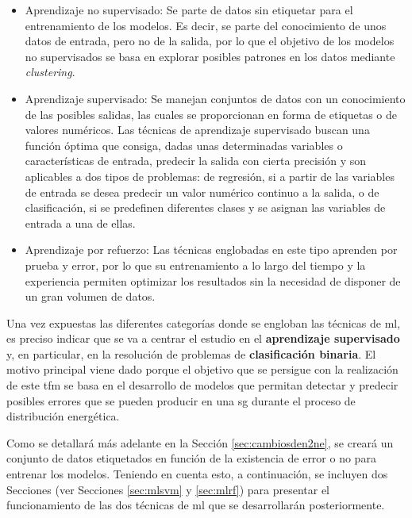 \begin{itemize}
    \item Aprendizaje no supervisado: Se parte de datos sin etiquetar para el entrenamiento de los modelos. Es decir, se parte del conocimiento de unos datos de entrada, pero no de la salida, por lo que el objetivo de los modelos no supervisados se basa en explorar posibles patrones en los datos mediante \textit{clustering}.
    \item Aprendizaje supervisado: Se manejan conjuntos de datos con un conocimiento de las posibles salidas, las cuales se proporcionan en forma de etiquetas o de valores numéricos. Las técnicas de aprendizaje supervisado buscan una función óptima que consiga, dadas unas determinadas variables o características de entrada, predecir la salida con cierta precisión y son aplicables a dos tipos de problemas: de regresión, si a partir de las variables de entrada se desea predecir un valor numérico continuo a la salida, o de clasificación, si se predefinen diferentes clases y se asignan las variables de entrada a una de ellas. 
    \item Aprendizaje por refuerzo: Las técnicas englobadas en este tipo aprenden por prueba y error, por lo que su entrenamiento a lo largo del tiempo y la experiencia permiten optimizar los resultados sin la necesidad de disponer de un gran volumen de datos.
\end{itemize}

Una vez expuestas las diferentes categorías donde se engloban las técnicas de \gls{ml}, es preciso indicar que se va a centrar el estudio en el \textbf{aprendizaje supervisado} y, en particular, en la resolución de problemas de \textbf{clasificación binaria}. El motivo principal viene dado porque el objetivo que se persigue con la realización de este \gls{tfm} se basa en el desarrollo de modelos que permitan detectar y predecir posibles errores que se pueden producir en una \gls{sg} durante el proceso de distribución energética. 

\vspace{3mm}

Como se detallará más adelante en la Sección \ref{sec:cambiosden2ne}, se creará un conjunto de datos etiquetados en función de la existencia de error o no para entrenar los modelos. Teniendo en cuenta esto, a continuación, se incluyen dos Secciones (ver Secciones \ref{sec:mlsvm} y \ref{sec:mlrf}) para presentar el funcionamiento de las dos técnicas de \gls{ml} que se desarrollarán posteriormente.

